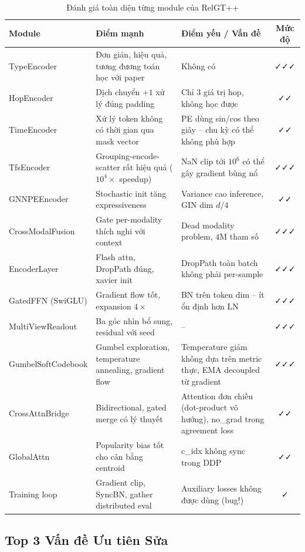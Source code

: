 \documentclass[12pt,a4paper]{article}
\begin{document}
\begin{table}[H]
\centering\small
\renewcommand{\arraystretch}{1.3}
\caption{Đánh giá toàn diện từng module của RelGT++}
\begin{tabularx}{\textwidth}{lXXc}
\toprule
\textbf{Module} & \textbf{Điểm mạnh} & \textbf{Điểm yếu / Vấn đề} & \textbf{Mức độ} \\
\midrule
TypeEncoder & Đơn giản, hiệu quả, tương đương toán học với paper & Không có & ✓✓✓ \\
HopEncoder & Dịch chuyển $+1$ xử lý đúng padding & Chỉ 3 giá trị hop, không học được & ✓✓ \\
TimeEncoder & Xử lý token không có thời gian qua mask vector & PE dùng sin/cos theo giây -- chu kỳ có thể không phù hợp & ✓✓ \\
TfsEncoder & Grouping-encode-scatter rất hiệu quả ($10^4\times$ speedup) & NaN clip tới $10^6$ có thể gây gradient bùng nổ & ✓✓✓ \\
GNNPEEncoder & Stochastic init tăng expressiveness & Variance cao inference, GIN dim $d/4$ & ✓✓ \\
CrossModalFusion & Gate per-modality thích nghi với context & Dead modality problem, $4$M tham số & ✓✓✓ \\
EncoderLayer & Flash attn, DropPath đúng, xavier init & DropPath toàn batch không phải per-sample & ✓✓✓ \\
GatedFFN (SwiGLU) & Gradient flow tốt, expansion $4\times$ & BN trên token dim -- ít ổn định hơn LN & ✓✓✓ \\
MultiViewReadout & Ba góc nhìn bổ sung, residual với seed & -- & ✓✓✓ \\
GumbelSoftCodebook & Gumbel exploration, temperature annealing, gradient flow & Temperature giảm không dựa trên metric thực, EMA decoupled từ gradient & ✓✓✓ \\
CrossAttnBridge & Bidirectional, gated merge có lý thuyết & Attention đơn chiều (dot-product vô hướng), no\_grad trong agreement loss & ✓✓ \\
GlobalAttn & Popularity bias tốt cho cân bằng centroid & c\_idx không sync trong DDP & ✓✓ \\
Training loop & Gradient clip, SyncBN, gather distributed eval & Auxiliary losses không được dùng (bug!) & ✓ \\
\bottomrule
\end{tabularx}
\end{table}

\subsection{Top 3 Vấn đề Ưu tiên Sửa}
\end{document}
